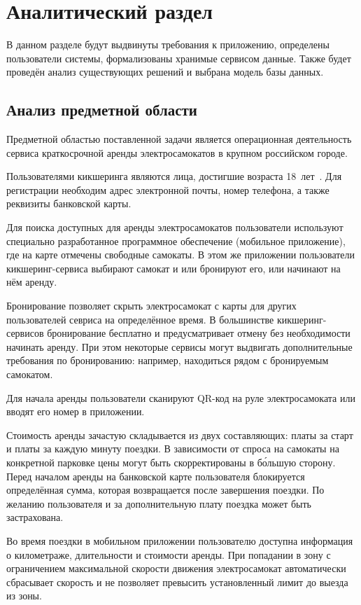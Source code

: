 \chapter{Аналитический раздел}

В данном разделе будут выдвинуты требования к приложению, определены пользователи системы, формализованы хранимые сервисом данные. Также будет проведён анализ существующих решений и выбрана модель базы данных.

\section{Анализ предметной области}

Предметной областью поставленной задачи является операционная деятельность сервиса краткосрочной аренды электросамокатов в крупном российском городе. 

Пользователями кикшеринга являются лица, достигшие возраста 18~лет~\cite{whoosh-reqs}\cite{urent-reqs}\cite{yago-reqs}. Для регистрации необходим адрес электронной почты, номер телефона, а также реквизиты банковской карты.

Для поиска доступных для аренды электросамокатов пользователи используют специально разработанное программное обеспечение (мобильное приложение), где на карте отмечены свободные самокаты. В этом же приложении пользователи кикшеринг-сервиса выбирают самокат и или бронируют его, или начинают на нём аренду.

Бронирование позволяет скрыть электросамокат с карты для других пользователей севриса на определённое время. В большинстве кикшеринг-сервисов бронирование бесплатно и предусматривает отмену без необходимости начинать аренду. При этом некоторые сервисы могут выдвигать дополнительные требования по бронированию: например, находиться рядом с бронируемым самокатом.

Для начала аренды пользователи сканируют QR-код на руле электросамоката или вводят его номер в приложении.

Стоимость аренды зачастую складывается из двух составляющих: платы за старт и платы за каждую минуту поездки. В зависимости от спроса на самокаты на конкретной парковке цены могут быть скорректированы в б\'{о}льшую сторону. Перед началом аренды на банковской карте пользователя блокируется определённая сумма, которая возвращается после завершения поездки. По желанию пользователя и за дополнительную плату поездка может быть застрахована. 

Во время поездки в мобильном приложении пользователю доступна информация о километраже, длительности и стоимости аренды. При попадании в зону с ограничением максимальной скорости движения электросамокат автоматически сбрасывает скорость и не позволяет превысить установленный лимит до выезда из зоны.

